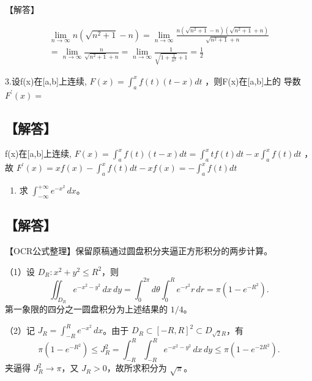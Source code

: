 \documentclass[11pt,fontset=fandol]{ctexart}
\providecommand{\tightlist}{\setlength{\itemsep}{0pt}\setlength{\parskip}{0pt}}
\begin{document}
【解答】

\[
\begin{array} { l } { \displaystyle \lim _ { n \to \infty } n ( \sqrt { n ^ { 2 } + 1 } - n ) = \displaystyle \lim _ { n \to \infty } \frac { n ( \sqrt { n ^ { 2 } + 1 } - n ) ( \sqrt { n ^ { 2 } + 1 } + n ) } { \sqrt { n ^ { 2 } + 1 } + n } } \\ { = \displaystyle \lim _ { n \to \infty } \frac { n } { \sqrt { n ^ { 2 } + 1 } + n } = \displaystyle \lim _ { n \to \infty } \frac { 1 } { \sqrt { 1 + \displaystyle \frac { 1 } { n ^ { 2 } } } + 1 } = \frac { 1 } { 2 } } \end{array}
\]

3.设f(x)在{[}a,b{]}上连续,
\(F ( x ) = \int _ { a } ^ { x } f ( t ) ( t - x ) d t\)
，则F(x)在{[}a,b{]}上的 导数 \(F ^ { \prime } ( x ) =\)

\subsection{【解答】}\label{ux89e3ux7b54}

f(x)在{[}a,b{]}上连续,
\(F ( x ) = \int _ { a } ^ { x } f ( t ) ( t - x ) d t = \int _ { a } ^ { x } t f ( t ) d t - x \int _ { a } ^ { x } f ( t ) d t\)
，故
\(F ^ { \prime } ( x ) = x f ( x ) - \int _ { a } ^ { x } f ( t ) d t - x f ( x ) = - \int _ { a } ^ { x } f ( t ) d t\)

\begin{enumerate}
\def\labelenumi{\arabic{enumi}.}
\setcounter{enumi}{3}
\tightlist
\item
  求 \(\int_{-\infty}^{+\infty}e^{-x^2}\,dx\)。
\end{enumerate}

\subsection{【解答】}\label{ux89e3ux7b54-1}

【OCR公式整理】保留原稿通过圆盘积分夹逼正方形积分的两步计算。

（1）设 \(D_R:x^2+y^2\le R^2\)，则 \[
\iint_{D_R}e^{-x^2-y^2}\,dx\,dy
=\int_0^{2\pi}d\theta\int_0^Re^{-r^2}r\,dr
=\pi(1-e^{-R^2}).
\] 第一象限的四分之一圆盘积分为上述结果的 \(1/4\)。

（2）记 \(J_R=\int_{-R}^Re^{-x^2}\,dx\)。由于
\(D_R\subset[-R,R]^2\subset D_{\sqrt2R}\)，有 \[
\pi(1-e^{-R^2})\le J_R^2
=\int_{-R}^R\int_{-R}^Re^{-x^2-y^2}\,dx\,dy
\le\pi(1-e^{-2R^2}).
\] 夹逼得 \(J_R^2\to\pi\)，又 \(J_R>0\)，故所求积分为 \(\sqrt\pi\)。
\end{document}
